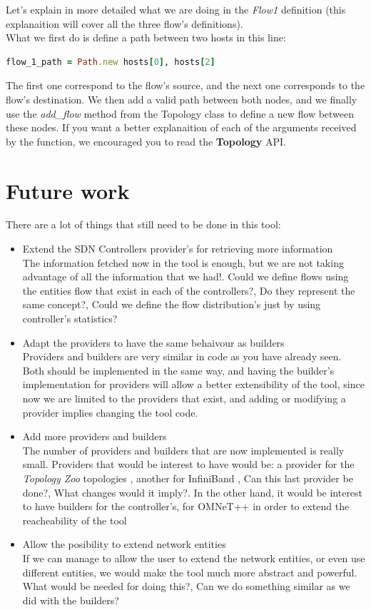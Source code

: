 Let's explain in more detailed what we are doing in the \textit{Flow1} definition (this explanaition will cover all the three flow's definitions).\\
What we first do is define a path between two hosts in this line: 

\begin{lstlisting}[language=Ruby,breaklines=true]
flow_1_path = Path.new hosts[0], hosts[2] 
\end{lstlisting}

The first one correspond to the flow's source, and the next one corresponds to the flow's destination. We then add a valid path between both nodes, and we finally use the \textit{add\_flow} method from the Topology class to define a new flow between these nodes. If you want a better explanaition of each of the arguments received by the function, we encouraged you to read the \textbf{Topology} API.

\section{Future work}

There are a lot of things that still need to be done in this tool:

\begin{itemize}
\item Extend the SDN Controllers provider's for retrieving more information\\
The information fetched now in the tool is enough, but we are not taking advantage of all the information that we had!. Could we define flows using the entities flow that exist in each of the controllers?, Do they represent the same concept?, Could we define the flow distribution's just by using controller's statistics?
\item Adapt the providers to have the same behaivour as builders\\
Providers and builders are very similar in code as you have already seen. Both should be implemented in the same way, and having the builder's implementation for providers will allow a better extensibility of the tool, since now we are limited to the providers that exist, and adding or modifying a provider implies changing the tool code. 
\item Add more providers and builders \\
The number of providers and builders that are now implemented is really small. Providers that would be interest to have would be: a provider for the \textit{Topology Zoo} topologies \cite{topologyzoo}, another for InfiniBand \cite{infiniband}, Can this last provider be done?, What changes would it imply?. In the other hand, it would be interest to have builders for the controller's, for OMNeT++ \cite{omnet} in order to extend the reacheability of the tool
\item Allow the posibility to extend network entities\\
If we can manage to allow the user to extend the network entities, or even use different entities, we would make the tool much more abstract and powerful. What would be needed for doing this?, Can we do something similar as we did with the builders?
\end{itemize}